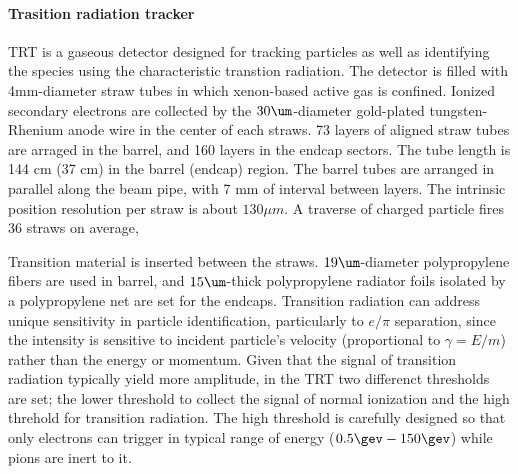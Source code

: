 

\paragraph{Trasition radiation tracker}
TRT is a gaseous detector designed for tracking particles as well as identifying the species using the characteristic transtion radiation.
The detector is filled with 4mm-diameter straw tubes in which xenon-based active gas is confined.
Ionized secondary electrons are collected by the $30\um$-diameter gold-plated tungsten-Rhenium anode wire in the center of each straws.
73 layers of aligned straw tubes are arraged in the barrel, and 160 layers in the endcap sectors. 
The tube length is 144 cm (37 cm) in the barrel (endcap) region. 
The barrel tubes are arranged in parallel along the beam pipe, with 7 mm of interval between layers.
The intrinsic position resolution per straw is about $130\mu m$.
A traverse of charged particle fires 36 straws on average, 

Transition material is inserted between the straws.
$19\um$-diameter polypropylene fibers are used in barrel, and $15\um$-thick polypropylene radiator foils isolated by a polypropylene net are set for the endcaps.
Transition radiation can address unique sensitivity in particle identification, particularly to  $e/\pi$ separation, 
since the intensity is sensitive to incident particle's velocity (proportional to $\gamma=E/m$) rather than the energy or momentum. 
Given that the signal of transition radiation typically yield more amplitude, in the TRT two differenct thresholds are set; 
the lower threshold to collect the signal of normal ionization and the high threhold for transition radiation. 
The high threshold is carefully designed so that only electrons can trigger in typical range of energy ($0.5\gev - 150 \gev$) while pions are inert to it. \\

